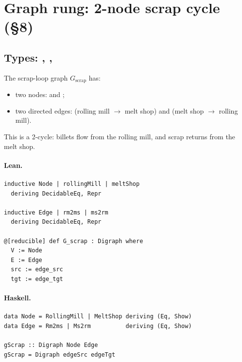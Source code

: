\documentclass[11pt,a4paper]{article}
\begin{document}
\section{Graph rung: 2-node scrap cycle (\S8)}

\subsection{Types: , , }

\begin{defn}
The scrap-loop graph $G_{\mathrm{scrap}}$ has:
\begin{itemize}
  \item two nodes:  and ;
  \item two directed edges:  (rolling mill $\to$ melt shop) and
     (melt shop $\to$ rolling mill).
\end{itemize}
This is a 2-cycle: billets flow from the rolling mill, and scrap returns from
the melt shop.
\end{defn}

\paragraph{Lean.}
\begin{lstlisting}[style=lean]
inductive Node | rollingMill | meltShop
  deriving DecidableEq, Repr

inductive Edge | rm2ms | ms2rm
  deriving DecidableEq, Repr

@[reducible] def G_scrap : Digraph where
  V := Node
  E := Edge
  src := edge_src
  tgt := edge_tgt
\end{lstlisting}

\paragraph{Haskell.}
\begin{lstlisting}[style=haskell]
data Node = RollingMill | MeltShop deriving (Eq, Show)
data Edge = Rm2ms | Ms2rm          deriving (Eq, Show)

gScrap :: Digraph Node Edge
gScrap = Digraph edgeSrc edgeTgt
\end{lstlisting}
\end{document}
